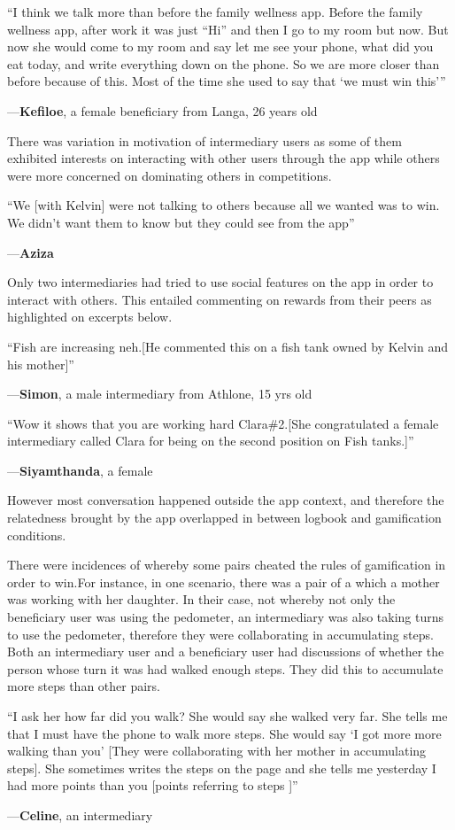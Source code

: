 \documentclass{sig-alternate}
\newenvironment{myquote}
               {\list{}{\rightmargin   \leftmargin
                        \parsep        0in }%
                \item\relax}
               {\endlist}
\newcommand{\userquote}[2]{\begin{samepage}\begin{myquote} 
     \em{\small{#2\begin{flushright}---#1\end{flushright}}}
   \end{myquote}\end{samepage}}
\begin{document}
\userquote{\textbf{Kefiloe}, a female beneficiary from Langa, 26 years old} {``I think we talk more than before the family wellness app. Before the family wellness app, after work it was just ``Hi'' and then I go to my room but now. But now she would come to my room  and say let me see your phone,  what did you eat today,  and write everything down on the phone. So we are more closer than before because of this. Most of the time she used to say that `we must win this'''} 

There was variation in motivation of intermediary users as some of them exhibited interests on interacting with other users through the app while others were more concerned on dominating others in competitions.

\userquote{\textbf{Aziza}} {``We [with Kelvin] were not talking to others because all we wanted was to win. We didn't want them to know but they could see from the app''}
 
Only two intermediaries had tried to use social features on the app in order to interact with others. This entailed commenting on rewards from their peers as highlighted on excerpts below.

\userquote{\textbf{Simon}, a male intermediary from Athlone, 15 yrs old} {``Fish are increasing neh.[He commented this on a fish tank owned by Kelvin and his mother]''} 

\userquote{\textbf{Siyamthanda}, a female } {``Wow it shows that you are working hard  Clara\#2.[She congratulated a female intermediary called Clara for being on the second position on Fish tanks.]''} 

However most conversation happened outside the app context, and therefore the relatedness brought by the app overlapped in between logbook and gamification conditions.

There were incidences of whereby some pairs cheated the rules of gamification in order to win.For instance, in one scenario, there was a pair of a which a mother was working with her daughter. In their case, not whereby not only the beneficiary user was using the pedometer, an intermediary was also taking turns to use the pedometer, therefore they were collaborating in accumulating steps. Both an intermediary user and a beneficiary user had discussions of whether the person whose turn it was had walked enough steps. They did this to accumulate more steps than other pairs.

\userquote{\textbf{Celine}, an intermediary} {``I ask her how far did you walk?  She would say she walked very far. She tells me that I must have the phone to walk more steps. She would say `I got more more walking than you' [They were collaborating with her mother in accumulating steps]. She sometimes writes the steps on the page and she tells me yesterday I had more points than you [points referring to steps ]''}   
\end{document}
